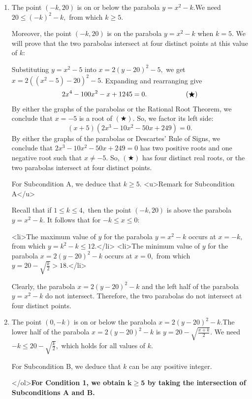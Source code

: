 \begin{enumerate}
\begin{enumerate}
 By a quick sketch, we have two subconditions:<ol style="margin-left: 1.5em;" type="A"> 
        \item The point $(-k,20)$ is on or below the parabola $y=x^2-k.$We need $20\leq(-k)^2-k,$ from which $k\geq5.$ 

 Moreover, the point $(-k,20)$ is on the parabola $y=x^2-k$ when $k=5.$ We will prove that the two parabolas intersect at four distinct points at this value of $k:$

 Substituting $y=x^2-5$ into $x=2(y-20)^2-5,$ we get $x=2\left(\left(x^2-5\right)-20\right)^2-5.$ Expanding and rearranging give 
 \[2x^4-100x^2-x+1245=0. \hspace{20mm}(\bigstar)\]By either the graphs of the parabolas or the Rational Root Theorem, we conclude that $x=-5$ is a root of $(\bigstar).$ So, we factor its left side: 
 \[(x+5)\left(2x^3-10x^2-50x+249\right)=0.\]By either the graphs of the parabolas or Descartes' Rule of Signs, we conclude that $2x^3-10x^2-50x+249=0$ has two positive roots and one negative root such that $x\neq-5.$ So, $(\bigstar)$ has four distinct real roots, or the two parabolas intersect at four distinct points.

 For Subcondition A, we deduce that $k\geq5.$
<u>Remark for Subcondition A</u>

 Recall that if $1\leq k\leq 4,$ then the point $(-k,20)$ is above the parabola $y=x^2-k.$ It follows that for $-k\leq x\leq0:$

            \begin{itemize}<li>The maximum value of $y$ for the parabola $y=x^2-k$ occurs at $x=-k,$ from which $y=k^2-k\leq12.$</li>
<li>The minimum value of $y$ for the parabola $x=2(y-20)^2-k$ occurs at $x=0,$ from which $y=20-\sqrt{\frac k2}>18.$</li>

            \end{itemize}
            Clearly, the parabola $x=2(y-20)^2-k$ and the left half of the parabola $y=x^2-k$ do not intersect. Therefore, the two parabolas do not intersect at four distinct points.

  
        \item The point $(0,-k)$ is on or below the parabola $x=2(y-20)^2-k.$The lower half of the parabola $x=2(y-20)^2-k$ is $y=20-\sqrt{\frac{x+k}{2}}.$ We need $-k\leq20-\sqrt{\frac k2},$ which holds for all values of $k.$

 For Subcondition B, we deduce that $k$ can be any positive integer.

 </ol>\textbf{For Condition 1, we obtain $\boldsymbol{k\geq5}$ by taking the intersection of Subconditions A and B.}


\end{enumerate}
\end{enumerate}
